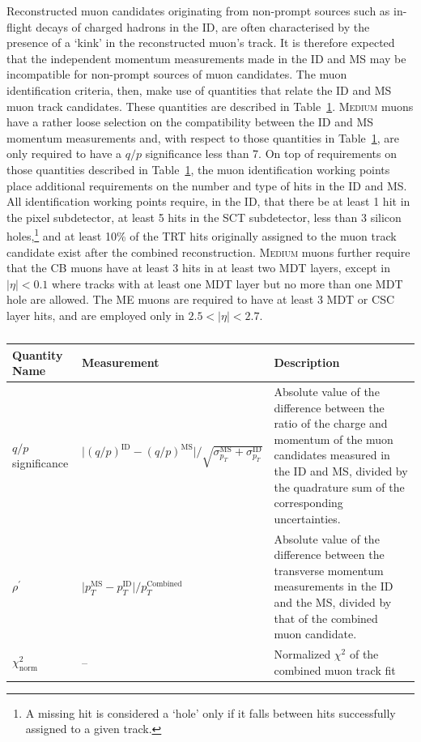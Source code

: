 Reconstructed muon candidates originating from non-prompt sources such
as in-flight decays of charged hadrons in the ID, are often characterised by the
presence of a `kink' in the reconstructed muon's track. It is therefore
expected that the independent momentum measurements made in the ID and MS may
be incompatible for non-prompt sources of muon candidates.
The muon identification criteria, then, make use of quantities
that relate the ID and MS muon track candidates.
These quantities are described in Table~\ref{tab:muon_id_vars}.
\textsc{Medium} muons have a rather loose selection on the compatibility between
the ID and MS momentum measurements and, with respect to those quantities in Table~\ref{tab:muon_id_vars},
are only required to have a $q/p$ significance less than 7.
On top of requirements on those quantities described in Table~\ref{tab:muon_id_vars},
the muon identification working points place
additional requirements on the number and type of hits in the ID and MS.
All identification working points require, in the ID, that there be at least 1 hit
in the pixel subdetector, at least 5 hits in the SCT subdetector, less
than 3 silicon holes,\footnote{A missing hit is considered a `hole' only
if it falls between hits successfully assigned to a given track.}
and at least 10\% of the TRT hits originally assigned to the muon track candidate exist
after the combined reconstruction.
\textsc{Medium} muons further require that the CB muons have at least 3 hits in at least
two MDT layers, except in $\lvert \eta \rvert < 0.1$ where tracks with at least one MDT layer but no more
than one MDT hole are allowed. The ME  muons are required to have at least
3 MDT or CSC layer hits, and are employed only in $2.5 < \lvert \eta \rvert < 2.7$.


\begin{table}[!htb]
    \begin{center}
        \begin{tabularx}{\textwidth}{l|X|X}
        \hline
        \hline
        \textbf{Quantity Name} & \textbf{Measurement} & \textbf{Description} \\
        \hline
        $q/p$ significance & $\lvert (q/p)^{\text{ID}} - (q/p)^{\text{MS}} \rvert / \sqrt{ \sigma_{p_T}^{\text{MS}} + \sigma_{p_T}^{\text{ID}}}$ &
                Absolute value of the difference between the ratio of the charge and momentum of the muon candidates measured in the ID and MS,
                divided by the quadrature sum of the corresponding uncertainties. \\
        \hline
        $\rho^{\prime}$ & $\lvert p_T^{\text{MS}} - p_T^{\text{ID}} \rvert / p_T^{\text{Combined}}$ &
                Absolute value of the difference between the transverse momentum measurements in the ID and the MS,
                divided by that of the combined muon candidate. \\
        \hline
        $\chi^2_{\text{norm}}$ & -- & Normalized $\chi^2$ of the combined muon track fit \\
        \hline
        \hline
        \end{tabularx}
    \end{center}
    \caption{
    }
    \label{tab:muon_id_vars}
\end{table}

